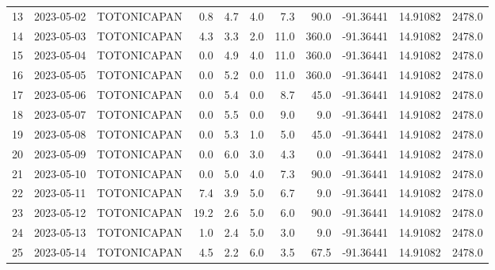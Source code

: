 \documentclass[12pt]{article}
\begin{document}
\begin{center}
\begin{tabular}{lllrrrrrrrr}
13  & 2023-05-02 &  TOTONICAPAN &     0.8 &      4.7 &  4.0 &         7.3 &        90.0 & -91.36441 &  14.91082 &   2478.0 \\
14  & 2023-05-03 &  TOTONICAPAN &     4.3 &      3.3 &  2.0 &        11.0 &       360.0 & -91.36441 &  14.91082 &   2478.0 \\
15  & 2023-05-04 &  TOTONICAPAN &     0.0 &      4.9 &  4.0 &        11.0 &       360.0 & -91.36441 &  14.91082 &   2478.0 \\
16  & 2023-05-05 &  TOTONICAPAN &     0.0 &      5.2 &  0.0 &        11.0 &       360.0 & -91.36441 &  14.91082 &   2478.0 \\
17  & 2023-05-06 &  TOTONICAPAN &     0.0 &      5.4 &  0.0 &         8.7 &        45.0 & -91.36441 &  14.91082 &   2478.0 \\
18  & 2023-05-07 &  TOTONICAPAN &     0.0 &      5.5 &  0.0 &         9.0 &         9.0 & -91.36441 &  14.91082 &   2478.0 \\
19  & 2023-05-08 &  TOTONICAPAN &     0.0 &      5.3 &  1.0 &         5.0 &        45.0 & -91.36441 &  14.91082 &   2478.0 \\
20  & 2023-05-09 &  TOTONICAPAN &     0.0 &      6.0 &  3.0 &         4.3 &         0.0 & -91.36441 &  14.91082 &   2478.0 \\
21  & 2023-05-10 &  TOTONICAPAN &     0.0 &      5.0 &  4.0 &         7.3 &        90.0 & -91.36441 &  14.91082 &   2478.0 \\
22  & 2023-05-11 &  TOTONICAPAN &     7.4 &      3.9 &  5.0 &         6.7 &         9.0 & -91.36441 &  14.91082 &   2478.0 \\
23  & 2023-05-12 &  TOTONICAPAN &    19.2 &      2.6 &  5.0 &         6.0 &        90.0 & -91.36441 &  14.91082 &   2478.0 \\
24  & 2023-05-13 &  TOTONICAPAN &     1.0 &      2.4 &  5.0 &         3.0 &         9.0 & -91.36441 &  14.91082 &   2478.0 \\
25  & 2023-05-14 &  TOTONICAPAN &     4.5 &      2.2 &  6.0 &         3.5 &        67.5 & -91.36441 &  14.91082 &   2478.0 \\
\bottomrule
\end{tabular}

        
        \end{center}
        
\end{document}
